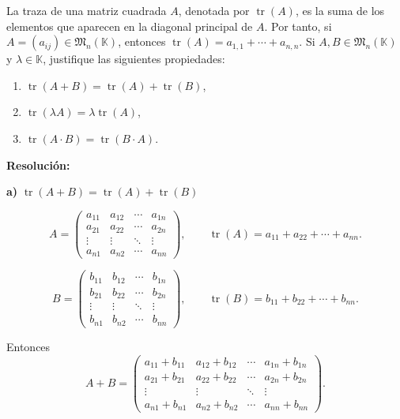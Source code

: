 \documentclass[a4paper,12pt]{article}
\begin{document}
\begin{ejercicio}[title=Ejercicio 7]
La traza de una matriz cuadrada $A$, denotada por $\operatorname{tr}(A)$, es la suma de los elementos que aparecen en la diagonal principal de $A$.  
Por tanto, si $A = (a_{ij}) \in \mathfrak{M}_n(\mathbb{K})$, entonces $\operatorname{tr}(A) = a_{1,1} + \cdots + a_{n,n}$.  
Si $A,B \in \mathfrak{M}_n(\mathbb{K})$ y $\lambda \in \mathbb{K}$, justifique las siguientes propiedades:

\begin{enumerate}
\item[a)] $\operatorname{tr}(A+B) = \operatorname{tr}(A) + \operatorname{tr}(B)$,
\item[b)] $\operatorname{tr}(\lambda A) = \lambda \operatorname{tr}(A)$,
\item[c)] $\operatorname{tr}(A \cdot B) = \operatorname{tr}(B \cdot A)$.
\end{enumerate}

\tcblower
\textbf{Resolución:}

\textbf{a)} $\operatorname{tr}(A+B) = \operatorname{tr}(A) + \operatorname{tr}(B)$

\[
A =
\begin{pmatrix}
a_{11} & a_{12} & \cdots & a_{1n} \\
a_{21} & a_{22} & \cdots & a_{2n} \\
\vdots & \vdots & \ddots & \vdots \\
a_{n1} & a_{n2} & \cdots & a_{nn}
\end{pmatrix},
\qquad
\operatorname{tr}(A)=a_{11}+a_{22}+\cdots+a_{nn}.
\]

\[
B =
\begin{pmatrix}
b_{11} & b_{12} & \cdots & b_{1n} \\
b_{21} & b_{22} & \cdots & b_{2n} \\
\vdots & \vdots & \ddots & \vdots \\
b_{n1} & b_{n2} & \cdots & b_{nn}
\end{pmatrix},
\qquad
\operatorname{tr}(B)=b_{11}+b_{22}+\cdots+b_{nn}.
\]

Entonces
\[
A+B =
\begin{pmatrix}
a_{11}+b_{11} & a_{12}+b_{12} & \cdots & a_{1n}+b_{1n} \\
a_{21}+b_{21} & a_{22}+b_{22} & \cdots & a_{2n}+b_{2n} \\
\vdots & \vdots & \ddots & \vdots \\
a_{n1}+b_{n1} & a_{n2}+b_{n2} & \cdots & a_{nn}+b_{nn}
\end{pmatrix}.
\]


\end{ejercicio}
\end{document}
